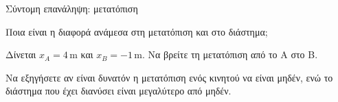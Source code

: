 \begin{Assessment}{Σύντομη επανάληψη: μετατόπιση}
\begin{AssessmentQuestion}
Ποια είναι η διαφορά ανάμεσα στη μετατόπιση και στο διάστημα;
\end{AssessmentQuestion}
\begin{AssessmentQuestion}[5]
Δίνεται $x_A=4\,\mathrm{m}$ και $x_B=-1\,\mathrm{m}$.
Να βρείτε τη μετατόπιση από το Α στο Β.
\end{AssessmentQuestion}
\begin{AssessmentQuestion}
Να εξηγήσετε αν είναι δυνατόν η μετατόπιση ενός κινητού να είναι μηδέν,
ενώ το διάστημα που έχει διανύσει είναι μεγαλύτερο από μηδέν.
\end{AssessmentQuestion}
\end{Assessment}
